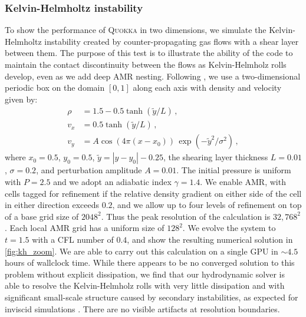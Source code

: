 \documentclass[fleqn,usenatbib]{mnras}
\begin{document}
\subsubsection{Kelvin-Helmholtz instability}
To show the performance of \textsc{Quokka} in two dimensions, we simulate the Kelvin-Helmholtz instability created by counter-propagating gas flows with a shear layer between them. The purpose of this test is to illustrate the ability of the code to maintain the contact discontinuity between the flows as Kelvin-Helmholz rolls develop, even as we add deep AMR nesting. Following \cite{Stone_2020}, we use a two-dimensional periodic box on the domain $[0, 1]$ along each axis with density and velocity given by:
\begin{align}
\rho &=  1.5 - 0.5 \tanh(\tilde y / L) \, , \\
v_x &= 0.5 \tanh(\tilde y / L) \, , \\
v_y &= A \cos(4\pi (x - x_0)) \, \exp(-{\tilde y}^2 / \sigma^2) \, ,
\end{align}
where $x_0 = 0.5$, $y_0 = 0.5$, $\tilde y = |y - y_0| - 0.25$, the shearing layer thickness $L = 0.01$, $\sigma = 0.2$, and perturbation amplitude $A = 0.01$. The initial pressure is uniform with $P = 2.5$ and we adopt an adiabatic index $\gamma = 1.4$. We enable AMR, with cells tagged for refinement if the relative density gradient on either side of the cell in either direction exceeds $0.2$, and we allow up to four levels of refinement on top of a base grid size of $2048^2$. Thus the peak resolution of the calculation is $32,768^2$. Each local AMR grid has a uniform size of $128^2$. We evolve the system to $t = 1.5$ with a CFL number of $0.4$, and show the resulting numerical solution in \autoref{fig:kh_zoom}. We are able to carry out this calculation on a single GPU in $\sim 4.5$ hours of wallclock time. While there appears to be no converged solution to this problem without explicit dissipation, we find that our hydrodynamic solver is able to resolve the Kelvin-Helmholz rolls with very little dissipation and with significant small-scale structure caused by secondary instabilities, as expected for inviscid simulations \citep{Lecoanet_2016}. There are no visible artifacts at resolution boundaries.
\end{document}
